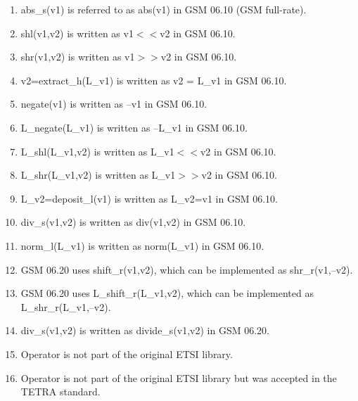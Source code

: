 \begin{enumerate}
\item abs\_s(v1) is referred to as abs(v1) in GSM 06.10 (GSM full-rate). 
\item shl(v1,v2) is written as v1$<<$v2 in GSM 06.10. 
\item shr(v1,v2) is written as v1$>>$v2 in GSM 06.10.
\item v2=extract\_h(L\_v1) is written as v2 = L\_v1 in GSM 06.10. 
\item negate(v1) is written as --v1 in GSM 06.10. 
\item L\_negate(L\_v1) is written as --L\_v1 in GSM 06.10. 
\item L\_shl(L\_v1,v2) is written as L\_v1$<<$v2 in GSM 06.10. 
\item L\_shr(L\_v1,v2) is written as L\_v1$>>$v2 in GSM 06.10. 
\item L\_v2=deposit\_l(v1) is written as L\_v2=v1 in GSM 06.10. 
\item div\_s(v1,v2) is written as div(v1,v2) in GSM 06.10. 
\item norm\_l(L\_v1) is written as norm(L\_v1) in GSM 06.10. 
\item GSM 06.20 uses shift\_r(v1,v2), which can be implemented 
        as shr\_r(v1,--v2).
\item GSM 06.20 uses L\_shift\_r(L\_v1,v2), which can be
        implemented as L\_shr\_r(L\_v1,--v2).
\item div\_s(v1,v2) is written as divide\_s(v1,v2) in GSM 06.20.
\item Operator is not part of the original ETSI library. 
\item Operator is not part of the original ETSI library but was
        accepted in the TETRA standard.
\end{enumerate}


